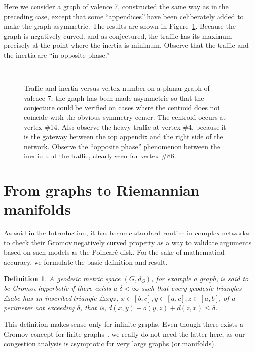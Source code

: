 \documentclass{article}
\newtheorem{definition}{Definition}
\begin{document}
Here we consider a graph of valence 7, constructed the same way as in the preceding case, 
except that some ``appendices'' have been deliberately added to make the graph asymmetric. 
The results are shown in Figure~\ref{f:asymmetric_congestion_issues}. 
Because the graph is negatively curved, and as conjectured, the traffic has its maximum  
precisely at the point where the inertia is minimum. 
Observe that the traffic and the inertia are ``in opposite phase.'' 

\begin{figure}[t]
\centering
\mbox{
}
\caption{Traffic and inertia versus vertex number on a planar graph of valence $7$;    
the graph has been made asymmetric so that the conjecture could be verified 
on cases where the centroid does not coincide with the obvious symmetry center. 
The centroid occurs at vertex \#14. Also observe the heavy traffic at vertex \#4, 
because it is the gateway between the top appendix and the right side of the network.  
Observe the ``opposite phase'' phenomenon between the inertia and the traffic, 
clearly seen for vertex \#86.}
\label{f:asymmetric_congestion_issues}
\end{figure}


\section{From graphs to Riemannian manifolds}
\label{s:graphs_to_manifolds}

As said in the Introduction, it has become standard routine in complex networks to check their Gromov 
negatively curved property as a way to validate arguments based on such models as the Poincar\'e disk. 
For the sake of mathematical accuracy, we formulate the basic definition and result.

\begin{definition}
A geodesic metric space $(G,d_G)$, for example a graph, 
is said to be Gromov hyperbolic if there exists a $\delta < \infty$ 
such that every geodesic triangles $\triangle abc$ has an inscribed triangle $\triangle xyz$, 
$x \in [b,c], y \in [a,c], z\in [a, b]$, of a perimeter not exceeding $\delta$, that is, 
$d(x,y)+d(y,z)+d(z,x)\leq \delta$.  
\end{definition} 
This definition makes sense only for infinite graphs. 
Even though there exists a Gromov concept for finite graphs~\cite{scaled_gromov}, we really do not need the latter here, 
as our congestion analysis is asymptotic for very large graphs (or manifolds). 
\end{document}
